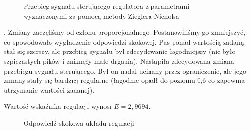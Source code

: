 \begin{figure}[t]
    \centering
    \caption{Przebieg sygnału sterującego regulatora z parametrami wyznaczonymi za pomocą metody Zieglera-Nicholsa}
    \label{zad5_zn_sterowanie}
\end{figure}
\FloatBarrier





\iffalse
{}. Zmiany zaczęliśmy od członu proporcjonalnego. Postanowiliśmy go zmniejszyć, co spowodowało wygładzenie odpowiedzi skokowej. Pas ponad wartością zadaną stał się szerszy, ale przebieg sygnału był zdecydowanie łagodniejszy (nie było szpiczastych pików i zniknęły małe drgania). Nastąpiła zdecydowana zmiana przebiegu sygnału sterującego. Był on nadal ucinany przez ograniczenie, ale jego zmiany stały się bardziej regularne (łagodnie opadł do poziomu 0,6 co zapewnia utrzymanie wartości zadanej).

\begin{center}
Wartość wskaźnika regulacji wynosi $E=2,9694$.
\end{center}
\begin{figure}[h]
    \centering
    \caption{Odpowiedź skokowa układu regulacji}
    \label{zad5_niegasnące_oscylacje}
\end{figure}

